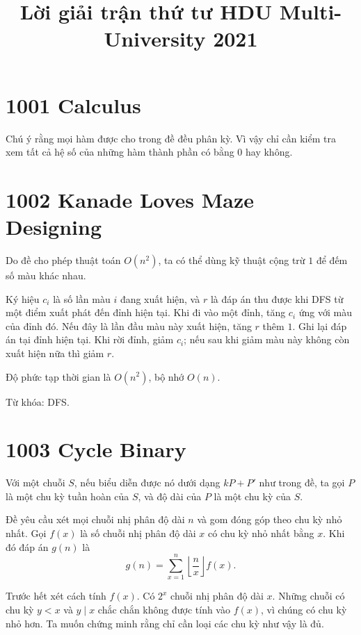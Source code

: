 \documentclass[11pt]{article}
\title{Lời giải trận thứ tư HDU Multi-University 2021}
\author{}
\date{}
\begin{document}
\maketitle


\section{1001 Calculus}

Chú ý rằng mọi hàm được cho trong đề đều phân kỳ. Vì vậy chỉ cần kiểm tra
xem tất cả hệ số của những hàm thành phần có bằng $0$ hay không.

\section{1002 Kanade Loves Maze Designing}

Do đề cho phép thuật toán $O(n^2)$, ta có thể dùng kỹ thuật cộng trừ $1$ để
đếm số màu khác nhau.

Ký hiệu $c_i$ là số lần màu $i$ đang xuất hiện, và $r$ là đáp án thu được khi
DFS từ một điểm xuất phát đến đỉnh hiện tại. Khi đi vào một đỉnh, tăng
$c_i$ ứng với màu của đỉnh đó. Nếu đây là lần đầu màu này xuất hiện, tăng
$r$ thêm $1$. Ghi lại đáp án tại đỉnh hiện tại. Khi rời đỉnh, giảm $c_i$;
nếu sau khi giảm màu này không còn xuất hiện nữa thì giảm $r$.

Độ phức tạp thời gian là $O(n^2)$, bộ nhớ $O(n)$.

Từ khóa: DFS.

\section{1003 Cycle Binary}

Với một chuỗi $S$, nếu biểu diễn được nó dưới dạng $kP+P'$ như trong đề, ta
gọi $P$ là một chu kỳ tuần hoàn của $S$, và độ dài của $P$ là một chu kỳ của
$S$.

Đề yêu cầu xét mọi chuỗi nhị phân độ dài $n$ và gom đóng góp theo chu kỳ nhỏ
nhất. Gọi $f(x)$ là số chuỗi nhị phân độ dài $x$ có chu kỳ nhỏ nhất bằng
$x$. Khi đó đáp án $g(n)$ là
\[
  g(n)=\sum_{x=1}^{n}\left\lfloor\frac{n}{x}\right\rfloor f(x).
\]

Trước hết xét cách tính $f(x)$. Có $2^x$ chuỗi nhị phân độ dài $x$. Những
chuỗi có chu kỳ $y<x$ và $y\mid x$ chắc chắn không được tính vào $f(x)$, vì
chúng có chu kỳ nhỏ hơn. Ta muốn chứng minh rằng chỉ cần loại các chu kỳ như
vậy là đủ.
\end{document}
